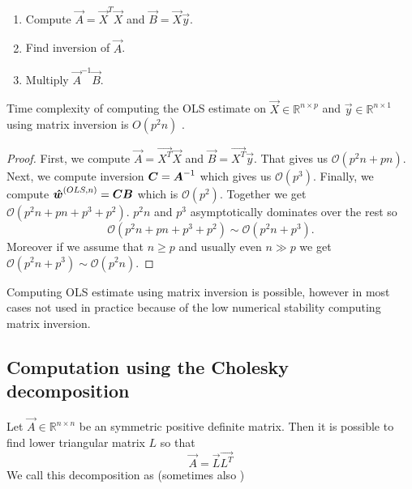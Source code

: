 \begin{enumerate}
 \item Compute  $\vec{A} = \vec{X}^T\vec{X}$ and $\vec{B} = \vec{X}\vec{y}$.
  \item Find inversion of $\vec{A}$.
  \item Multiply $\vec{A}^{-1}\vec{B}$.
\end{enumerate}

\begin{observation} \label{time:complexity:ols:inversion}
    Time complexity of computing the OLS  estimate on $\vec{X} \in \mathbb{R}^{n \times p}$ and $\vec{y}  \in \mathbb{R}^{n \times 1}$ using matrix inversion is $O(p^2n)$ .
\end{observation}

\begin{proof}
First, we compute 
$\vec{A} = \vec{X^T}\vec{X}$  and
$\vec{B} = \vec{X^T}\vec{y}$. 
That gives us $\mathcal{O}(p^2n + pn)$.
Next, we compute inversion  $\m{C} = \m{A}^{-1}$ which gives us $\mathcal{O}(p^3)$.
Finally, we compute
$ \vec{\hat{w}}^{(OLS,n)} = \m{C}\m{B}$ which is $\mathcal{O}(p^2)$. 
Together we get $ \mathcal{O}(p^2n + pn + p^3 + p^2)$.
$p^2n$ and $p^3$ asymptotically dominates over the rest so 
\begin{equation}
\mathcal{O}(p^2n + pn + p^3 + p^2) \sim \mathcal{O}(p^2n + p^3).
\end{equation}
Moreover if we assume that $n \ge p$ and usually even $n \gg p$  we get $\mathcal{O}(p^2n + p^3) \sim \mathcal{O}(p^2n)$.
\end{proof}

Computing OLS estimate using matrix inversion is possible, however in most cases not used in practice because of the low numerical stability computing matrix inversion.



\subsection{Computation using the Cholesky decomposition}

\begin{definition}
    Let $\vec{A} \in \mathbb{R}^{n \times n}$ be an symmetric positive definite matrix. Then it is possible to find lower triangular matrix $L$ so that 
    \begin{equation}
        \vec{A} = \vec{L}\vec{L^T}
    \end{equation}
    We call this decomposition as  (sometimes also  )
\end{definition}
    
